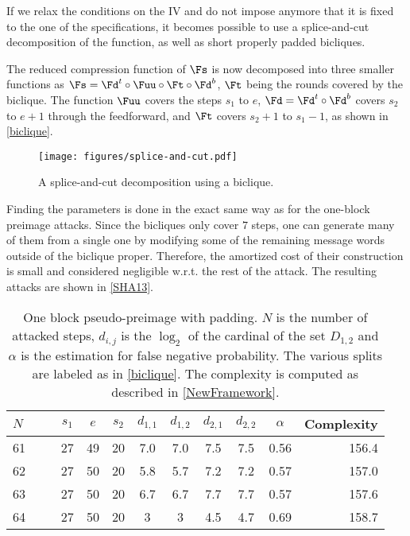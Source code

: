   If we relax the conditions on the IV and do not impose anymore that it is fixed
  to the one of the specifications, it becomes possible to use a splice-and-cut
  decomposition of the function, as well as short properly padded bicliques.

  The reduced compression function of \shaone $\Fs$ is now decomposed into three smaller
  functions as $\Fs = \Fd^t \circ \Fuu \circ \Ft \circ \Fd^b$, $\Ft$ being the rounds covered by the
  biclique. The function $\Fuu$ covers the steps $s_1$ to $e$, $\Fd = \Fd^t \circ \Fd^b$ covers
  $s_2$ to $e + 1$ through the feedforward, and $\Ft$ covers $s_2 + 1$ to $s_1 - 1$, as shown in
  \autoref{biclique}.

    \begin{figure}
	\center
      \texttt{[image: figures/splice-and-cut.pdf]}
      \caption{A splice-and-cut decomposition using a biclique.\label{biclique}}
    \end{figure}

    Finding the parameters is done in the exact same way as for the one-block preimage attacks.
    Since the bicliques only cover $7$ steps, one can generate many of them
    from a single one by modifying some of the remaining message words outside of the biclique proper.
    Therefore, the amortized cost of their construction is small and considered negligible w.r.t. the
    rest of the attack. The resulting attacks are shown in \autoref{SHA13}.

  \begin{table}[ht]
    \caption[One block pseudo-preimage with padding.]{One block pseudo-preimage with padding. $N$ is the 
              number of attacked steps, $d_{i,j}$ is the $\log_2$ of the cardinal
              of the set $D_{1,2}$ and $\alpha$ is the estimation for false negative probability.
              The various splits are labeled as in \autoref{biclique}.
            The complexity is computed as described in \autoref{NewFramework}.\label{SHA13}}
    \begin{center}
      \begin{tabular}{l c c c c c  c c c r @{}} \toprule
        $N\qquad$ & $s_1$ & $e$ & $s_2$ & $d_{1,1}$ &  $d_{1,2}$ & $d_{2,1}$ & $d_{2,2}$ & $\alpha $ & Complexity \\\midrule
        61    & 27 & 49 & 20   & 7.0  & 7.0 & 7.5 & 7.5  & 0.56  & 156.4\\ 
        62    & 27 & 50 & 20   & 5.8  & 5.7 & 7.2 & 7.2  & 0.57  & 157.0\\ 
        63    & 27 & 50 & 20   & 6.7  & 6.7 & 7.7 & 7.7  & 0.57  & 157.6\\ 
        64    & 27 & 50 & 20   & 3 & 3 & 4.5 & 4.7  & 0.69  & 158.7\\ 
        \bottomrule
        \hline
      \end{tabular}
    \end{center}
  \end{table}

